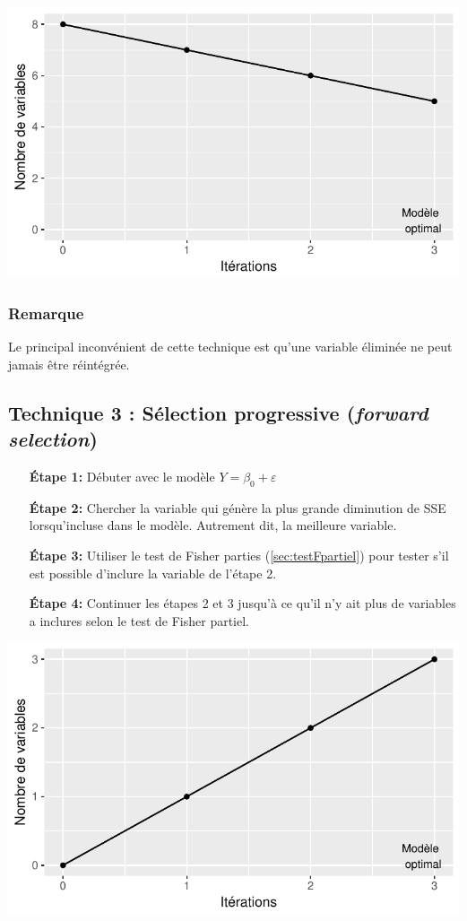 \documentclass[11pt,french]{report}
\begin{document}
\includegraphics{notes_de_cours-025}

\subsubsection*{Remarque}
Le principal inconvénient de cette technique est qu'une variable éliminée ne peut jamais être réintégrée. 

\subsection{Technique 3 : Sélection progressive (\emph{forward selection})}
\label{tech3}

\begin{itemize}
\item [\textbf{Étape 1:}] Débuter avec le modèle $Y = \beta_0 + \varepsilon$

\item [\textbf{Étape 2:}] Chercher la variable qui génère la plus grande diminution de SSE lorsqu'incluse dans le modèle. Autrement dit, la meilleure variable.

\item [\textbf{Étape 3:}] Utiliser le test de Fisher parties (\ref{sec:testFpartiel}) pour tester s'il est possible d'inclure la variable de l'étape 2.

\item [\textbf{Étape 4:}] Continuer les étapes 2 et 3 jusqu'à ce qu'il n'y ait plus de variables a inclures selon le test de Fisher partiel.
\end{itemize}
\bigskip

\includegraphics{notes_de_cours-026}
\end{document}
